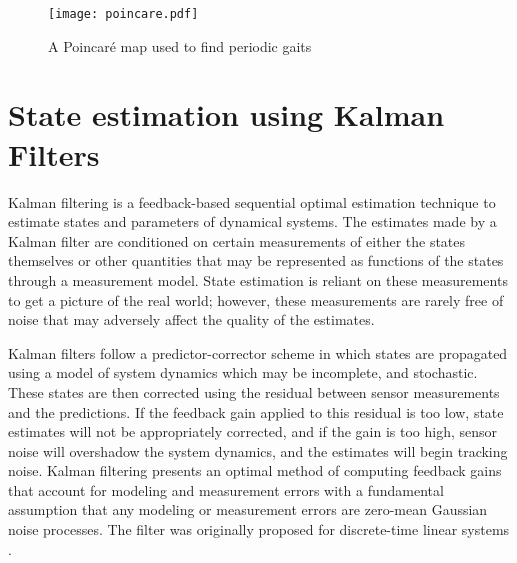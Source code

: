 \begin{figure}
	\centering
	\texttt{[image: poincare.pdf]}
	\caption{A Poincar\'e map used to find periodic gaits}\label{fig:poincare}
\end{figure}

\section{State estimation using Kalman Filters}

Kalman filtering is a feedback-based sequential optimal estimation technique \cite{kalman1960new} to estimate states and parameters of dynamical systems. The estimates made by a Kalman filter are conditioned on certain measurements of either the states themselves or other quantities that may be represented as functions of the states through a measurement model. State estimation is reliant on these measurements to get a picture of the real world; however, these measurements are rarely free of noise that may adversely affect the quality of the estimates. 

Kalman filters follow a predictor-corrector scheme in which states are propagated using a model of system dynamics which may be incomplete, and stochastic. These states are then corrected using the residual between sensor measurements and the predictions. If the feedback gain applied to this residual is too low, state estimates will not be appropriately corrected, and if the gain is too high, sensor noise will overshadow the system dynamics, and the estimates will begin tracking noise. Kalman filtering presents an optimal method of computing feedback gains that account for modeling and measurement errors with a fundamental assumption that any modeling or measurement errors are zero-mean Gaussian noise processes. The filter was originally proposed for discrete-time linear systems \cite{kalman1960new}. 
 
